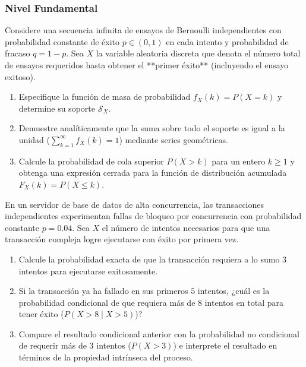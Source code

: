 \subsubsection*{Nivel Fundamental}

\begin{problema}
	\label{prob:3.5.1}
	Considere una secuencia infinita de ensayos de Bernoulli independientes con probabilidad constante de éxito $p \in (0, 1)$ en cada intento y probabilidad de fracaso $q = 1-p$. Sea $X$ la variable aleatoria discreta que denota el número total de ensayos requeridos hasta obtener el **primer éxito** (incluyendo el ensayo exitoso).
	\begin{enumerate}
		\item Especifique la función de masa de probabilidad $f_X(k) = P(X = k)$ y determine su soporte $\mathcal{S}_X$.
		\item Demuestre analíticamente que la suma sobre todo el soporte es igual a la unidad ($\sum_{k=1}^{\infty} f_X(k) = 1$) mediante series geométricas.
		\item Calcule la probabilidad de cola superior $P(X > k)$ para un entero $k \ge 1$ y obtenga una expresión cerrada para la función de distribución acumulada $F_X(k) = P(X \le k)$.
	\end{enumerate}
\end{problema}

\begin{problema}
	\label{prob:3.5.2}
	En un servidor de base de datos de alta concurrencia, las transacciones independientes experimentan fallas de bloqueo por concurrencia con probabilidad constante $p = 0.04$. Sea $X$ el número de intentos necesarios para que una transacción compleja logre ejecutarse con éxito por primera vez.
	\begin{enumerate}
		\item Calcule la probabilidad exacta de que la transacción requiera a lo sumo $3$ intentos para ejecutarse exitosamente.
		\item Si la transacción ya ha fallado en sus primeros $5$ intentos, ¿cuál es la probabilidad condicional de que requiera más de $8$ intentos en total para tener éxito ($P(X > 8 \mid X > 5)$)?
		\item Compare el resultado condicional anterior con la probabilidad no condicional de requerir más de $3$ intentos ($P(X > 3)$) e interprete el resultado en términos de la propiedad intrínseca del proceso.
	\end{enumerate}
\end{problema}

